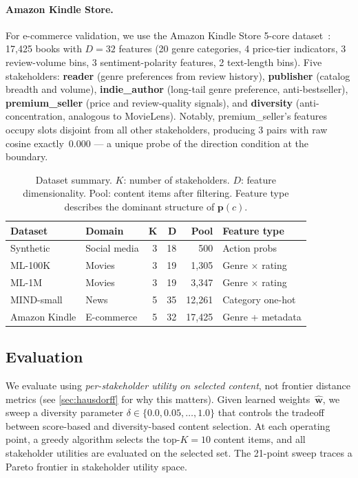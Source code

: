 \documentclass[11pt,letterpaper]{article}
\begin{document}
\paragraph{Amazon Kindle Store.}

For e-commerce validation, we use the Amazon Kindle Store
5-core dataset~\cite{ni2019justifying}: 17{,}425 books with
$D = 32$ features (20 genre categories, 4 price-tier indicators,
3 review-volume bins, 3 sentiment-polarity features, 2 text-length
bins). Five stakeholders:
\textbf{reader} (genre preferences from review history),
\textbf{publisher} (catalog breadth and volume),
\textbf{indie\_author} (long-tail genre preference, anti-bestseller),
\textbf{premium\_seller} (price and review-quality signals), and
\textbf{diversity} (anti-concentration, analogous to MovieLens).
Notably, premium\_seller's features occupy slots disjoint from all
other stakeholders, producing 3 pairs with raw cosine exactly~$0.000$
--- a unique probe of the direction condition at the boundary.

\begin{table}[t]
  \caption{Dataset summary. $K$: number of stakeholders.
    $D$: feature dimensionality. Pool: content items after filtering.
    Feature type describes the dominant structure of $\mathbf{p}(c)$.}
  \label{tab:datasets}
  \centering\small
  \begin{tabular}{llrrrl}
    \toprule
    \textbf{Dataset} & \textbf{Domain} & $\boldsymbol{K}$ &
      $\boldsymbol{D}$ & \textbf{Pool} & \textbf{Feature type} \\
    \midrule
    Synthetic     & Social media & 3 & 18 & 500   & Action probs \\
    ML-100K       & Movies       & 3 & 19 & 1{,}305 & Genre $\times$ rating \\
    ML-1M         & Movies       & 3 & 19 & 3{,}347 & Genre $\times$ rating \\
    MIND-small    & News         & 5 & 35 & 12{,}261 & Category one-hot \\
    Amazon Kindle & E-commerce   & 5 & 32 & 17{,}425 & Genre + metadata \\
    \bottomrule
  \end{tabular}
\end{table}

\subsection{Evaluation}
\label{sec:eval}

We evaluate using \emph{per-stakeholder utility on selected
content}, not frontier distance metrics (see \cref{sec:hausdorff}
for why this matters). Given learned weights~$\hat{\mathbf{w}}$, we
sweep a diversity parameter
$\delta \in \{0.0, 0.05, \ldots, 1.0\}$ that controls the tradeoff
between score-based and diversity-based content selection. At each
operating point, a greedy algorithm selects the top-$K = 10$ content
items, and all stakeholder utilities are evaluated on the selected
set. The 21-point sweep traces a Pareto frontier in stakeholder
utility space.
\end{document}
